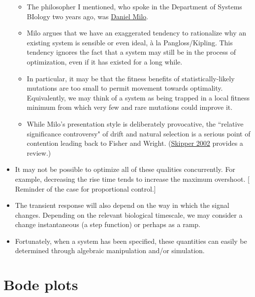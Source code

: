 \documentclass{article}
\begin{document}
\begin{itemize}
\begin{itemize}
\item The philosopher I mentioned, who spoke in the Department of Systems BIology two years ago, was \href{http://www.danielmilo.com/}{Daniel Milo}.
\item Milo argues that we have an exaggerated tendency to rationalize why an existing system is sensible or even ideal, \`{a} la Pangloss/Kipling. This tendency ignores the fact that a system may still be in the process of optimization, even if it has existed for a long while.
\item In particular, it may be that the fitness benefits of statistically-likely mutations are too small to permit movement towards optimality. Equivalently, we may think of a system as being trapped in a local fitness minimum from which very few and rare mutations could improve it.
\item While Milo's presentation style is deliberately provocative, the ``relative significance controversy" of drift and natural selection is a serious point of contention leading back to Fisher and Wright. (\href{http://philsci-archive.pitt.edu/1750/1/skipper_controversy.pdf}{Skipper 2002} provides a review.)
\end{itemize}


\item It may not be possible to optimize all of these qualities concurrently. For example, decreasing the rise time tends to increase the maximum overshoot. [ Reminder of the case for proportional control.]

\item The transient response will also depend on the way in which the signal changes. Depending on the relevant biological timescale, we may consider a change instantaneous (a step function) or perhaps as a ramp.

\item Fortunately, when a system has been specified, these quantities can easily be determined through algebraic manipulation and/or simulation.

\end{itemize}

\section*{Bode plots}
\end{document}
